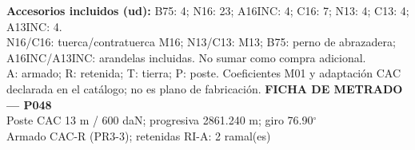 \begingroup\scriptsize
\textbf{Accesorios incluidos (ud):} B75: 4; N16: 23; A16INC: 4; C16: 7; N13: 4; C13: 4; A13INC: 4.\\
N16/C16: tuerca/contratuerca M16; N13/C13: M13; B75: perno de abrazadera; A16INC/A13INC: arandelas incluidas. No sumar como compra adicional.\\
A: armado; R: retenida; T: tierra; P: poste. Coeficientes M01 y adaptación CAC declarada en el catálogo; no es plano de fabricación.
\endgroup\endgroup
\clearpage{}
\begingroup\small\setlength{\parskip}{3pt}\renewcommand{\arraystretch}{1.05}
\textbf{\large FICHA DE METRADO — P048}\\[4pt]
Poste CAC 13 m / 600 daN; progresiva 2861.240 m; giro 76.90\ensuremath{^\circ}\\
Armado CAC-R (PR3-3); retenidas RI-A: 2 ramal(es)\\
\begingroup\scriptsize
